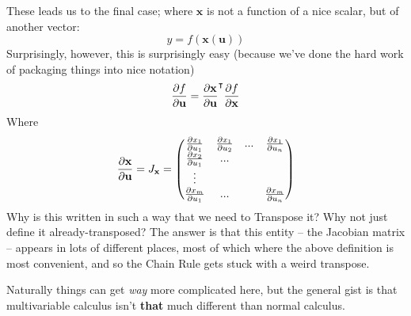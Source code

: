 \documentclass[a4paper,openany,11pt]{book}
\renewcommand\vec[1]{\boldsymbol{\mathbf{#1}}}
\begin{document}
			These leads us to the final case; where $\vec{x}$ is not a function of a nice scalar, but of another vector:
			\begin{equation}
				y = f(\vec{x}(\vec{u}))
			\end{equation}
			Surprisingly, however, this is surprisingly easy (because we've done the hard work of packaging things into nice notation)
			\begin{equation}
				\pdiv{f}{\vec{u}} = \pdiv{\vec{x}}{\vec{u}}^\intercal \pdiv{f}{\vec{x}}
			\end{equation}
			Where
			\begin{equation}
					\pdiv{\vec{x}}{\vec{u}} = J_{\vec{x}} = \begin{pmatrix} \pdiv{x_1}{u_1} & \pdiv{x_1}{u_2} & ... & \pdiv{x_1}{u_n} \\ \pdiv{x_2}{u_1} & ... \\ \vdots \\ \pdiv{x_m}{u_1} & ... & & \pdiv{x_m}{u_n} \end{pmatrix}
				\end{equation}
				Why is this written in such a way that we need to Transpose it? Why not just define it already-transposed? The answer is that this entity -- the Jacobian matrix -- appears in lots of different places, most of which where the above definition is most convenient, and so the Chain Rule gets stuck with a weird transpose.
			
		
				Naturally things can get \textit{way} more complicated here, but the general gist is that multivariable calculus isn't \textbf{that} much different than normal calculus. 





\end{document}
